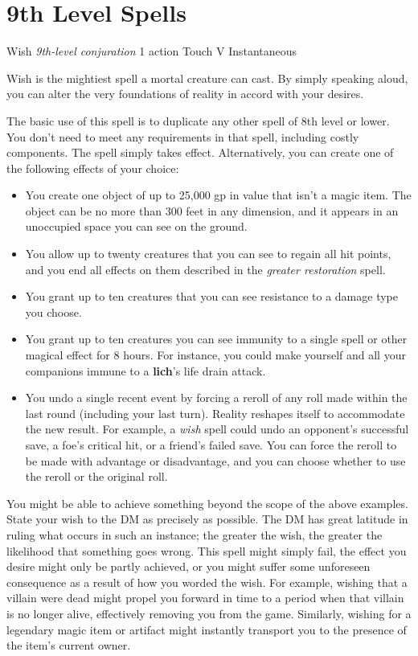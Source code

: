 \documentclass[letterpaper, 11pt, bg=full, twocolumn, stats=modern]{dndbook}
\begin{document}
\section{9th Level Spells}

\vspace{0.5em}

\DndSpellHeader%
  {Wish}
  {\textit{9th-level conjuration}
}
  {1 action}
  {Touch}
  {  V
}
  {Instantaneous}

\noindent
Wish is the mightiest spell a mortal creature can cast. By simply speaking aloud, you can alter the very foundations of reality in accord with your desires.

The basic use of this spell is to duplicate any other spell of 8th level or lower. You don't need to meet any requirements in that spell, including costly components. The spell simply takes effect. Alternatively, you can create one of the following effects of your choice:

\begin{itemize}
\item You create one object of up to 25,000 gp in value that isn't a magic item. The object can be no more than 300 feet in any dimension, and it appears in an unoccupied space you can see on the ground.
\item You allow up to twenty creatures that you can see to regain all hit points, and you end all effects on them described in the \textit{greater restoration} spell.
\item You grant up to ten creatures that you can see resistance to a damage type you choose.
\item You grant up to ten creatures you can see immunity to a single spell or other magical effect for 8 hours. For instance, you could make yourself and all your companions immune to a \textbf{lich}'s life drain attack.
\item You undo a single recent event by forcing a reroll of any roll made within the last round (including your last turn). Reality reshapes itself to accommodate the new result. For example, a \textit{wish} spell could undo an opponent's successful save, a foe's critical hit, or a friend's failed save. You can force the reroll to be made with advantage or disadvantage, and you can choose whether to use the reroll or the original roll.
\end{itemize}

You might be able to achieve something beyond the scope of the above examples. State your wish to the DM as precisely as possible. The DM has great latitude in ruling what occurs in such an instance; the greater the wish, the greater the likelihood that something goes wrong. This spell might simply fail, the effect you desire might only be partly achieved, or you might suffer some unforeseen consequence as a result of how you worded the wish. For example, wishing that a villain were dead might propel you forward in time to a period when that villain is no longer alive, effectively removing you from the game. Similarly, wishing for a legendary magic item or artifact might instantly transport you to the presence of the item's current owner.
\end{document}
